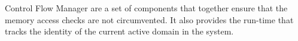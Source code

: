 %
%
%
%
%
%
%
%
Control Flow Manager are a set of components that together ensure that
the memory access checks are not circumvented.
%
It also provides the run-time that tracks the identity of the current
active domain in the system.